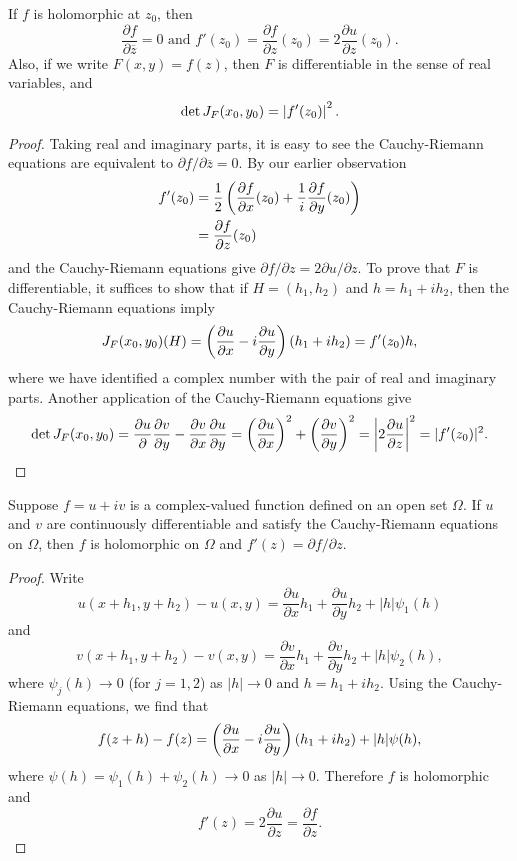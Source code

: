 \documentclass{exam}
\begin{document}
\noqed
\begin{proposition}\label{prop:main}
    If $f$ is holomorphic at $z_0$, then
    $$\frac{\partial f}{\partial \overline{z}} = 0 \text{ and } 
    f'(z_0) = \frac{\partial f}{\partial z}(z_0) = 2\frac{\partial u}{\partial z}(z_0).$$
    Also, if we write $F(x, y) = f(z)$, then $F$ is differentiable in the sense of real variables, and
    $$\det{J_F}(x_0, y_0) = \left| f'(z_0) \right|^2.$$
\end{proposition}
\yesqed
\begin{proof}
    Taking real and imaginary parts, it is easy to see the Cauchy-Riemann equations are equivalent to $\partial f / \partial \overline{z} = 0$.
    By our earlier observation
    \begin{align*}
        f'(z_0) &= \frac{1}{2}\left( \frac{\partial f}{\partial x}(z_0) + \frac{1}{i}\frac{\partial f}{\partial y}(z_0) \right) \\
        &= \frac{\partial f}{\partial z}(z_0)
    \end{align*}
    and the Cauchy-Riemann equations give $\partial f / \partial z = 2\partial u / \partial z$. To prove that $F$ is differentiable,
    it suffices to show that if $H = (h_1, h_2)$ and $h = h_1 + ih_2$, then the Cauchy-Riemann equations imply
    $$J_F(x_0, y_0)(H) = \left( \frac{\partial u}{\partial x} - i\frac{\partial u}{\partial y} \right)(h_1 + ih_2) = f'(z_0)h,$$
    where we have identified a complex number with the pair of real and imaginary parts. Another application of the Cauchy-Riemann equations
    give
    $$\det{J_F}(x_0, y_0) = \frac{\partial u}{\partial }\frac{\partial v}{\partial y} - \frac{\partial v}{\partial x}\frac{\partial u}{\partial y}
    = \left( \frac{\partial u}{\partial x} \right)^2 + \left( \frac{\partial v}{\partial y} \right)^2 = \left| 2\frac{\partial u}{\partial z} \right|^2 = |f'(z_0)|^2.$$
\end{proof}

\noqed
\begin{theorem}\label{thm:main}
    Suppose $f = u + iv$ is a complex-valued function defined on an open set $\Omega$. If $u$ and $v$ are continuously differentiable 
    and satisfy the Cauchy-Riemann equations on $\Omega$, then $f$ is holomorphic on $\Omega$ and $f'(z) = \partial f / \partial z$.
\end{theorem}
\yesqed
\begin{proof}
    Write 
    $$u(x + h_1, y + h_2) - u(x, y) = \frac{\partial u}{\partial x}h_1 + \frac{\partial u}{\partial y}h_2 + |h|\psi_1(h)$$
    and
    $$v(x + h_1, y + h_2) - v(x, y) = \frac{\partial v}{\partial x}h_1 + \frac{\partial v}{\partial y}h_2 + |h|\psi_2(h),$$
    where $\psi_j (h)\to 0$ (for $j = 1,2$) as $|h|\to 0$ and $h = h_1 + ih_2$. Using the Cauchy-Riemann equations, we find that
    $$f(z + h) - f(z) = \left( \frac{\partial u}{\partial x} - i\frac{\partial u}{\partial y} \right)(h_1 + ih_2) + |h|\psi(h),$$
    where $\psi(h) = \psi_1(h) + \psi_2(h)\to 0$ as $|h|\to 0$. Therefore $f$ is holomorphic and 
    $$f'(z) = 2\frac{\partial u}{\partial z} = \frac{\partial f}{\partial z}.$$
\end{proof}
\end{document}
